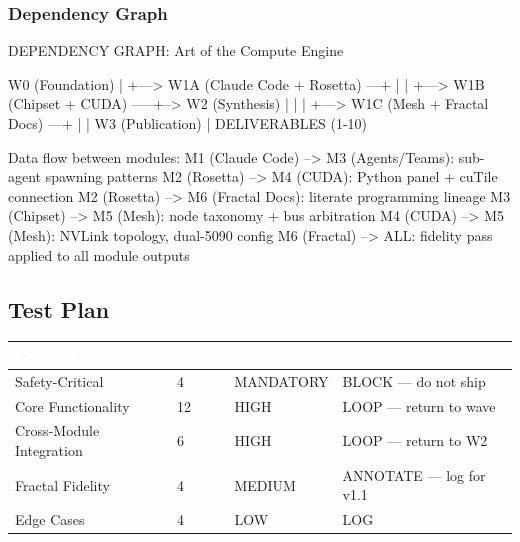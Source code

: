 \documentclass[11pt,letterpaper]{article}
\newcommand{\tableheader}[1]{\textbf{\sffamily\textcolor{white}{#1}}}
\begin{document}
\subsubsection{Dependency Graph}

\begin{asciibox}
DEPENDENCY GRAPH: Art of the Compute Engine

  W0 (Foundation)
   |
   +---> W1A (Claude Code + Rosetta)  ---+
   |                                     |
   +---> W1B (Chipset + CUDA)       -----+--> W2 (Synthesis)
   |                                     |         |
   +---> W1C (Mesh + Fractal Docs)  ---+           |
                                                   |
                                             W3 (Publication)
                                                   |
                                           DELIVERABLES (1-10)

Data flow between modules:
  M1 (Claude Code) --> M3 (Agents/Teams): sub-agent spawning patterns
  M2 (Rosetta)     --> M4 (CUDA): Python panel + cuTile connection
  M2 (Rosetta)     --> M6 (Fractal Docs): literate programming lineage
  M3 (Chipset)     --> M5 (Mesh): node taxonomy + bus arbitration
  M4 (CUDA)        --> M5 (Mesh): NVLink topology, dual-5090 config
  M6 (Fractal)     --> ALL: fidelity pass applied to all module outputs
\end{asciibox}

\subsection{Test Plan}

\begin{center}
\begin{tabularx}{\textwidth}{L{3cm}C{1.5cm}L{2cm}L{3cm}}
\toprule
{}
\tableheader{Category} & \tableheader{Count} & \tableheader{Priority} & \tableheader{Action on Fail} \\
\midrule
Safety-Critical & 4 & MANDATORY & BLOCK --- do not ship \\
Core Functionality & 12 & HIGH & LOOP --- return to wave \\
Cross-Module Integration & 6 & HIGH & LOOP --- return to W2 \\
Fractal Fidelity & 4 & MEDIUM & ANNOTATE --- log for v1.1 \\
Edge Cases & 4 & LOW & LOG \\
\bottomrule
\end{tabularx}
\end{center}
\end{document}
